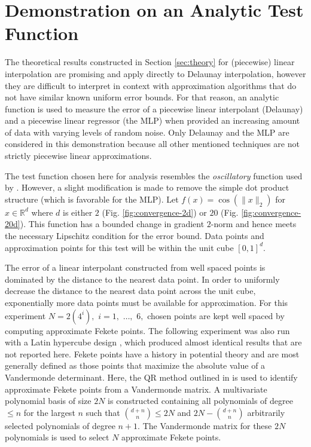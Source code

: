 \vspace{-2mm}
\section{Demonstration on an Analytic Test Function}
\label{sec:analytic}

The theoretical results constructed in Section \ref{sec:theory} for
(piecewise) linear interpolation are promising and apply directly to
Delaunay interpolation, however they are difficult to interpret in
context with approximation algorithms that do not have similar known
uniform error bounds. For that reason, an analytic function is used to
measure the error of a piecewise linear interpolant (Delaunay) and a
piecewise linear regressor (the MLP) when provided an increasing
amount of data with varying levels of random noise. Only
Delaunay and the MLP are considered in this demonstration because
all other mentioned techniques are not strictly piecewise linear
approximations.

The test function chosen here for analysis resembles the
\textit{oscillatory} function used by \cite{barthelmann2000high}.
However, a slight modification is made to remove the simple dot
product structure (which is favorable for the MLP). Let $f(x)
=\cos(\|x\|_2)$ for $x \in \mathbb{R}^d$ where $d$ is either $2$
(Fig. \ref{fig:convergence-2d}) or $20$
(Fig. \ref{fig:convergence-20d}). This function has a bounded change
in gradient $2$-norm and hence meets the necessary Lipschitz condition
for the error bound. Data points and approximation points for this
test will be within the unit cube $[0,1]^d$.

The error of a linear interpolant constructed from well spaced points
is dominated by the distance to the nearest data point. In order to
uniformly decrease the distance to the nearest data point across the
unit cube, exponentially more data points must be available for
approximation. For this experiment $N = 2(4^i),$ $i = 1,$ $\ldots,$
$6,$ chosen points are kept well spaced by computing approximate
Fekete points. The following experiment was also run with a
  Latin hypercube design \cite{park1994optimal}, which produced almost
  identical results that are not reported here. Fekete points have
a history in potential theory \cite{kovari_pommerenke_1968} and are
most generally defined as those points that maximize the absolute
value of a Vandermonde determinant. Here, the QR method outlined in
\cite{bos2010computing} is used to identify approximate Fekete points
from a Vandermonde matrix. A multivariate polynomial basis of size
$2N$ is constructed containing all polynomials of degree $\leq n$ for
the largest $n$ such that ${d+n \choose n} \leq 2N$ and $2N - {d+n
  \choose n}$ arbitrarily selected polynomials of degree $n + 1.$ The
Vandermonde matrix for these $2N$ polynomials is used to select $N$
approximate Fekete points.

